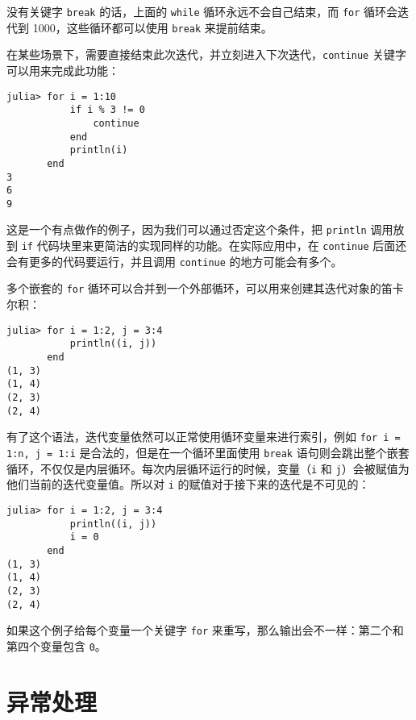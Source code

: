 没有关键字 \texttt{break} 的话，上面的 \texttt{while} 循环永远不会自己结束，而 \texttt{for} 循环会迭代到 1000，这些循环都可以使用 \texttt{break} 来提前结束。



在某些场景下，需要直接结束此次迭代，并立刻进入下次迭代，\texttt{continue} 关键字可以用来完成此功能：




\begin{verbatim}
julia> for i = 1:10
           if i % 3 != 0
               continue
           end
           println(i)
       end
3
6
9
\end{verbatim}



这是一个有点做作的例子，因为我们可以通过否定这个条件，把 \texttt{println} 调用放到 \texttt{if} 代码块里来更简洁的实现同样的功能。在实际应用中，在 \texttt{continue} 后面还会有更多的代码要运行，并且调用 \texttt{continue} 的地方可能会有多个。



多个嵌套的 \texttt{for} 循环可以合并到一个外部循环，可以用来创建其迭代对象的笛卡尔积：




\begin{verbatim}
julia> for i = 1:2, j = 3:4
           println((i, j))
       end
(1, 3)
(1, 4)
(2, 3)
(2, 4)
\end{verbatim}



有了这个语法，迭代变量依然可以正常使用循环变量来进行索引，例如 \texttt{for i = 1:n, j = 1:i} 是合法的，但是在一个循环里面使用 \texttt{break} 语句则会跳出整个嵌套循环，不仅仅是内层循环。每次内层循环运行的时候，变量（\texttt{i} 和 \texttt{j}）会被赋值为他们当前的迭代变量值。所以对 \texttt{i} 的赋值对于接下来的迭代是不可见的：




\begin{verbatim}
julia> for i = 1:2, j = 3:4
           println((i, j))
           i = 0
       end
(1, 3)
(1, 4)
(2, 3)
(2, 4)
\end{verbatim}



如果这个例子给每个变量一个关键字 \texttt{for} 来重写，那么输出会不一样：第二个和第四个变量包含 \texttt{0}。



\hypertarget{11112426789887598982}{}


\section{异常处理}



